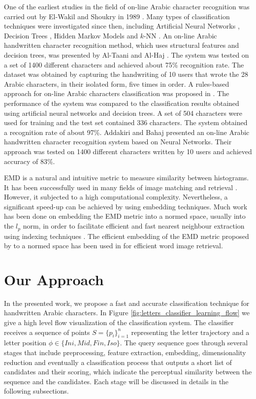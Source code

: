 \documentclass[10pt, conference, compsocconf]{IEEEtran}
\begin{document}
One of the earliest studies in the field of on-line Arabic character recognition was carried out by El-Wakil and Shoukry in 1989 \cite{el1989line}.
Many types of classification techniques were investigated since then, including Artificial Neural Networks \cite{alijla2012oiahcr,ismail2012online}, Decision Trees \cite{ismail2012online, al2010recognition, omer2010online}, Hidden Markov Models \cite{biadsy2006online} and $k$-NN \cite{elglaly2011isolated}.
An on-line Arabic handwritten character recognition method, which uses structural features and decision trees, was presented by Al-Taani and Al-Haj \cite{al2010recognition}. 
The system was tested on a set of 1400 different characters and achieved about 75\% recognition rate. 
The dataset was obtained by capturing the handwriting of 10 users that wrote the 28 Arabic characters, in their isolated form, five times in order.
A rules-based approach for on-line Arabic characters classification was proposed in \cite{ismail1859online}. 
The performance of the system was compared to the classification results obtained using artificial neural networks and decision trees. 
A set of 504 characters were used for training and the test set contained 336 characters. 
The system obtained a recognition rate of about 97\%. 
Addakiri and Bahaj \cite{addakiri2012line} presented an on-line Arabic handwritten character
recognition system based on Neural Networks. 
Their approach was tested on 1400 different characters written by 10 users and achieved accuracy of 83\%.

EMD is a natural and intuitive metric to measure similarity between histograms. 
It has been successfully used in many fields of image matching and retrieval \cite{grauman2004fast, rubner2000earth}.
However, it subjected to a high computational complexity.
Nevertheless, a significant speed-up can be achieved by using embedding techniques.
Much work has been done on embedding the EMD metric into a normed space, usually into the $l_p$ norm, in order to facilitate efficient and fast nearest neighbour extraction using indexing techniques \cite{bourgain1985lipschitz}. 
The efficient embedding of the EMD metric proposed by \cite{shirdhonkar2008approximate} to a normed space has been used in \cite{saabni2013efficient} for efficient word image retrieval.

\section{Our Approach}
\label{sec:approach}
In the presented work, we propose a fast and accurate classification technique for handwritten Arabic characters.
In Figure \ref{fig:letters_classifier_learning_flow} we give a high level flow visualization of the classification system.
The classifier receives a sequence of points $S=\{p_{i}\}_{i=1}^{n}$ representing the letter trajectory and a letter position $\phi \in \{Ini, Mid, Fin, Iso\}$.
The query sequence goes through several stages that include preprocessing, feature extraction, embedding, dimensionality reduction and eventually a classification process that outputs a short list of candidates and their scoring, which indicate the perceptual similarity between the sequence and the candidates. 
Each stage will be discussed in details in the following subsections.
\end{document}
